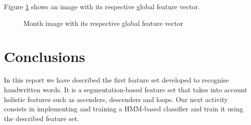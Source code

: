 \documentclass{article}[14pt, oneside, a4paper, times]
\begin{document}
Figure \ref{agosto:fig} shows an image with its respective global feature vector. 

\begin{figure}[htbp]
   \centering
   \caption{Month image with its respective global feature vector}
   \label{agosto:fig}
\end{figure}


\section{Conclusions}

In this report we have described the first feature set  developed to recognise handwritten words. It is a segmentation-based feature set that takes into account holistic features such as ascenders, descenders and loops. Our next activity consists in implementing and training a HMM-based classifier and train it using the described feature set.




\end{document}
